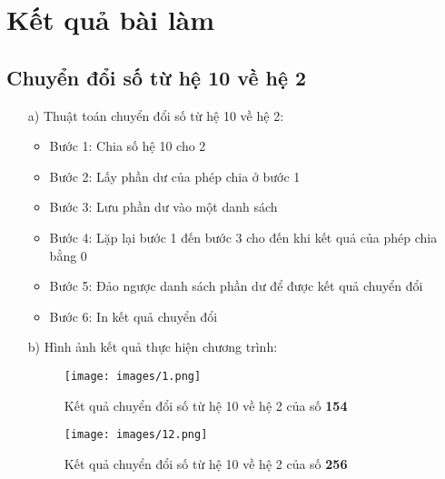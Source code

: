 \documentclass[20pt]{article}
\begin{document}
\section{Kết quả bài làm}
\subsection{Chuyển đổi số từ hệ 10 về hệ 2}
\begin{enumerate}
    \item[a)] Thuật toán chuyển đổi số từ hệ 10 về hệ 2:
    \begin{itemize}
        \item Bước 1: Chia số hệ 10 cho 2
        \item Bước 2: Lấy phần dư của phép chia ở bước 1
        \item Bước 3: Lưu phần dư vào một danh sách
        \item Bước 4: Lặp lại bước 1 đến bước 3 cho đến khi kết quả của phép chia bằng 0
        \item Bước 5: Đảo ngược danh sách phần dư để được kết quả chuyển đổi
        \item Bước 6: In kết quả chuyển đổi
    \end{itemize}
    \item[b)] Hình ảnh kết quả thực hiện chương trình:
    \begin{figure}[H]
        \centering
        \texttt{[image: images/1.png]}
        \caption{Kết quả chuyển đổi số từ hệ 10 về hệ 2 của số \textbf{154}}
        \label{fig:my_label}
    \end{figure}
    \begin{figure}[H]
        \centering
        \texttt{[image: images/12.png]}
        \caption{Kết quả chuyển đổi số từ hệ 10 về hệ 2 của số \textbf{256}}
        \label{fig:my_label}
    \end{figure}
\end{enumerate}
\end{document}
